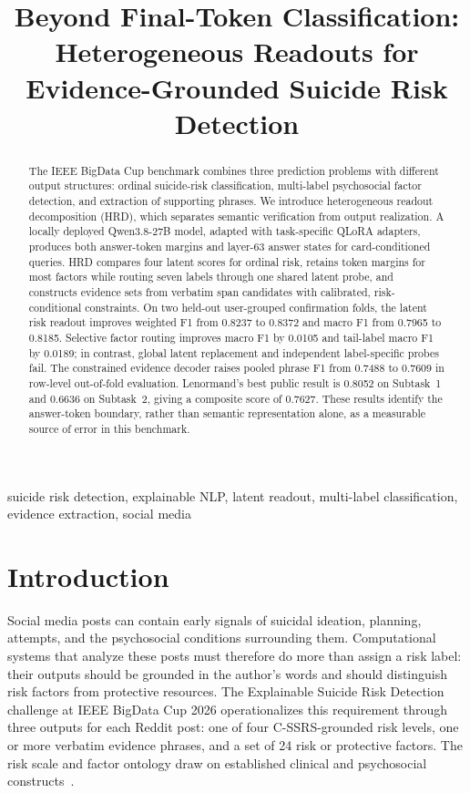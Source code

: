 \documentclass[conference]{IEEEtran}
\title{Beyond Final-Token Classification: Heterogeneous Readouts for Evidence-Grounded Suicide Risk Detection}
\author{
\IEEEauthorblockN{Zirui Li and Yanling Li}
\IEEEauthorblockA{
The Hong Kong Polytechnic University, Hong Kong SAR, China\\
25044237g@connect.polyu.hk; lynnn.li@connect.polyu.hk}
\and
\IEEEauthorblockN{Kaolanglang Gao}
\IEEEauthorblockA{
Shenzhen University, Shenzhen, China\\
2510032049@mails.szu.edu.cn}
}
\newcommand{\method}{\textsc{HRD}}
\begin{document}
\maketitle

\begin{abstract}
The IEEE BigData Cup benchmark combines three prediction problems with different output structures: ordinal suicide-risk classification, multi-label psychosocial factor detection, and extraction of supporting phrases. We introduce heterogeneous readout decomposition (\method{}), which separates semantic verification from output realization. A locally deployed Qwen3.8-27B model, adapted with task-specific QLoRA adapters, produces both answer-token margins and layer-63 answer states for card-conditioned queries. \method{} compares four latent scores for ordinal risk, retains token margins for most factors while routing seven labels through one shared latent probe, and constructs evidence sets from verbatim span candidates with calibrated, risk-conditional constraints. On two held-out user-grouped confirmation folds, the latent risk readout improves weighted F1 from 0.8237 to 0.8372 and macro F1 from 0.7965 to 0.8185. Selective factor routing improves macro F1 by 0.0105 and tail-label macro F1 by 0.0189; in contrast, global latent replacement and independent label-specific probes fail. The constrained evidence decoder raises pooled phrase F1 from 0.7488 to 0.7609 in row-level out-of-fold evaluation. Lenormand's best public result is 0.8052 on Subtask~1 and 0.6636 on Subtask~2, giving a composite score of 0.7627. These results identify the answer-token boundary, rather than semantic representation alone, as a measurable source of error in this benchmark.
\end{abstract}

\begin{IEEEkeywords}
suicide risk detection, explainable NLP, latent readout, multi-label classification, evidence extraction, social media
\end{IEEEkeywords}

\section{Introduction}
Social media posts can contain early signals of suicidal ideation, planning, attempts, and the psychosocial conditions surrounding them. Computational systems that analyze these posts must therefore do more than assign a risk label: their outputs should be grounded in the author's words and should distinguish risk factors from protective resources. The Explainable Suicide Risk Detection challenge at IEEE BigData Cup 2026 operationalizes this requirement through three outputs for each Reddit post: one of four C-SSRS-grounded risk levels, one or more verbatim evidence phrases, and a set of 24 risk or protective factors. The risk scale and factor ontology draw on established clinical and psychosocial constructs~\cite{li2025protective,posner2011cssrs}.
\end{document}
